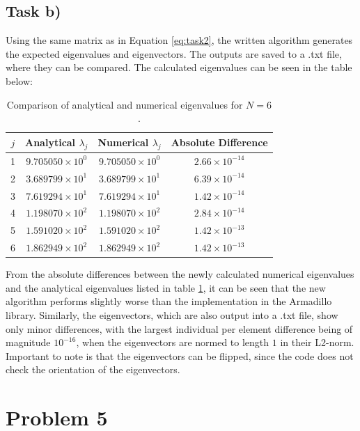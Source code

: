 \documentclass[english,notitlepage]{revtex4-1}  %
\begin{document}
\subsection*{Task b)}
Using the same matrix as in Equation \ref{eq:task2}, the written algorithm generates the expected eigenvalues and eigenvectors. The outputs are saved to a .txt file, where they can be compared. The calculated eigenvalues can be seen in the table below:

\begin{table}[H]
\centering
\begin{tabular}{cccc}
\hline
$j$ & Analytical $\lambda_j$ & Numerical $\lambda_j$ & Absolute Difference \\
\hline
1 & $9.705050\times10^{0}$ & $9.705050\times10^{0}$ & $2.66\times10^{-14}$ \\
2 & $3.689799\times10^{1}$ & $3.689799\times10^{1}$ & $6.39\times10^{-14}$ \\
3 & $7.619294\times10^{1}$ & $7.619294\times10^{1}$ & $1.42\times10^{-14}$ \\
4 & $1.198070\times10^{2}$ & $1.198070\times10^{2}$ & $2.84\times10^{-14}$ \\
5 & $1.591020\times10^{2}$ & $1.591020\times10^{2}$ & $1.42\times10^{-13}$ \\
6 & $1.862949\times10^{2}$ & $1.862949\times10^{2}$ & $1.42\times10^{-13}$ \\
\hline
\end{tabular}
\caption{Comparison of analytical and numerical eigenvalues for $N = 6$.}\label{tab:task5}
\end{table}
From the absolute differences between the newly calculated numerical eigenvalues and the analytical eigenvalues listed in table \ref{tab:task5}, it can be seen that the new algorithm performs slightly worse than the implementation in the Armadillo library.  Similarly, the eigenvectors, which are also output into a .txt file, show only minor differences, with the largest individual per element difference being of magnitude $10^{-16}$, when the eigenvectors are normed to length $1$ in their L2-norm. Important to note is that the eigenvectors can be flipped, since the code does not check the orientation of the eigenvectors.

\section*{Problem 5}
\end{document}
